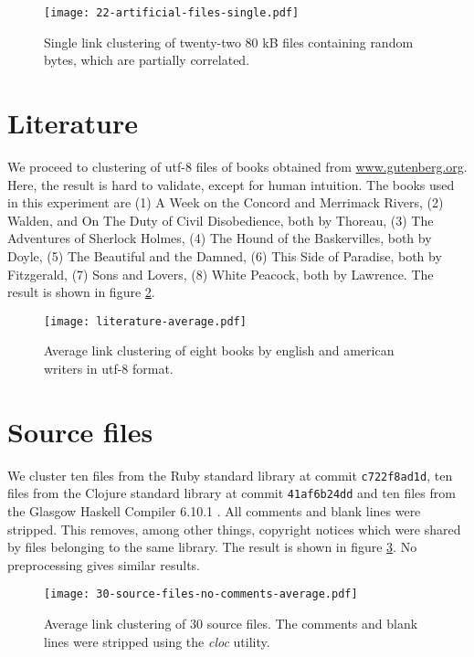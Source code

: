 \begin{figure}[h!]
  \texttt{[image: 22-artificial-files-single.pdf]}
  \caption{Single link clustering of twenty-two 80 kB files containing random bytes, which are partially correlated.}
  \label{figure:22_artificial_files}
\end{figure}

\section{Literature}

We proceed to clustering of utf-8 files of books obtained from \url{www.gutenberg.org}. Here, the result is hard to validate, except for human intuition. The books used in this experiment are (1) A Week on the Concord and Merrimack Rivers, (2) Walden, and On The Duty of Civil Disobedience, both by Thoreau, (3) The Adventures of Sherlock Holmes, (4) The Hound of the Baskervilles, both by Doyle, (5) The Beautiful and the Damned, (6) This Side of Paradise, both by Fitzgerald, (7) Sons and Lovers, (8) White Peacock, both by Lawrence. The result is shown in figure \ref{figure:8_books}.

\begin{figure}[h!]
  \texttt{[image: literature-average.pdf]}
  \caption{Average link clustering of eight books by english and american writers in utf-8 format.}
  \label{figure:8_books}
\end{figure}


\section{Source files}

We cluster ten files from the Ruby standard library \cite{ruby} at commit \texttt{c722f8ad1d}, ten files from the Clojure standard library \cite{clojure} at commit \texttt{41af6b24dd} and ten files from the Glasgow Haskell Compiler 6.10.1 \cite{ghc}. All comments and blank lines were stripped. This removes, among other things, copyright notices which were shared by files belonging to the same library. The result is shown in figure \ref{figure:30_source_files}. No preprocessing gives similar results.

\begin{figure}[h!]
  \texttt{[image: 30-source-files-no-comments-average.pdf]}
  \caption{Average link clustering of 30 source files. The comments and blank lines were stripped using the \emph{cloc} utility.}
  \label{figure:30_source_files}
\end{figure}


